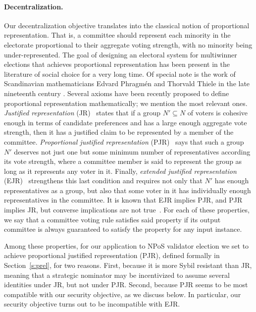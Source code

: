 \paragraph{Decentralization.}
Our decentralization objective translates into the classical notion of proportional representation. That is, a committee should represent each minority in the electorate proportional to their aggregate voting strength, with no minority being under-represented. 
The goal of designing an electoral system for multiwinner elections that achieves proportional representation has been present in the literature of social choice for a very long time. Of special note is the work of Scandinavian mathematicians Edvard Phragm\'{e}n and Thorvald Thiele in the late nineteenth century \cite{phragmen1894methode, phragmen1895proportionella, phragmen1896theorie, phragmen1899till, thiele1895om, janson2016phragmen}. 
Several axioms have been recently proposed to define proportional representation mathematically; we mention the most relevant ones. 
\emph{Justified representation} (JR)~\cite{aziz2017justified} states that if a group $N'\subseteq N$ of voters is cohesive enough in terms of candidate preferences and has a large enough aggregate vote strength, then it has a justified claim to be represented by a member of the committee.
\emph{Proportional justified representation} (PJR)~\cite{sanchez2017proportional} says that such a group $N'$ deserves not just one but some minimum number of representatives according its vote strength, where a committee member is said to represent the group as long as it represents any voter in it.
Finally, \emph{extended justified representation} (EJR)~\cite{aziz2017justified} strengthens this last condition and requires not only that $N'$ has enough representatives as a group, but also that some voter in it has individually enough representatives in the committee.
It is known that EJR implies PJR, and PJR implies JR, but converse implications are not true~\cite{sanchez2017proportional}. 
For each of these properties, we say that a committee voting rule satisfies said property if its output committee is always guaranteed to satisfy the property for any input instance. 

Among these properties, for our application to NPoS validator election we set to achieve proportional justified representation (PJR), defined formally in Section~\ref{s:prel}, for two reasons. 
First, because it is more Sybil resistant than JR, meaning that a strategic nominator may be incentivized to assume several identities under JR, but not under PJR. 
Second, because PJR seems to be most compatible with our security objective, as we discuss below. In particular, our security objective turns out to be incompatible with EJR. 

